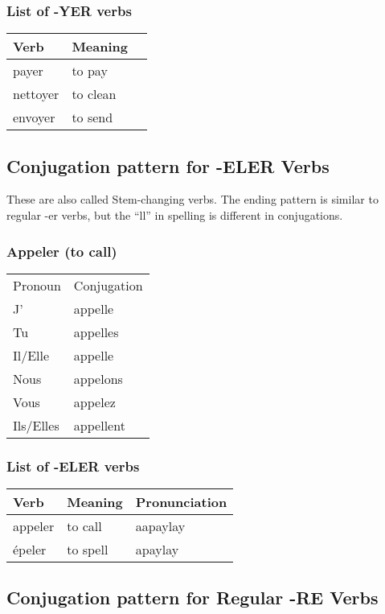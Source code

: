 \subsubsection{List of -YER verbs}
\begin{longtable}{| l | l | l |}
\hline
Verb 		& Meaning 	\\
\hline
\endhead
payer 	& to pay	\\  \hline
nettoyer	& to clean		\\  \hline
envoyer 	& to send	\\  \hline
\end{longtable}


\subsection{Conjugation pattern for -ELER Verbs}
These are also called Stem-changing verbs. The ending pattern is similar
to regular -er verbs, but the ``ll'' in spelling is different in conjugations.

\subsubsection{Appeler (to call)}
\begin{tabular}{| l | l |}
\hline
Pronoun 	& 	Conjugation	\\
J'		&	appelle		\\
Tu		&	appelles	\\
Il/Elle		&	appelle		\\
Nous		&	appelons	\\
Vous		&	appelez		\\
Ils/Elles	&	appellent	\\
\hline
\end{tabular}

\subsubsection{List of -ELER verbs}
\begin{longtable}{| l | l | l |}
\hline
Verb 		& Meaning 		& Pronunciation	\\
\hline
\endhead
appeler 	& to call		& aapaylay	\\
\'epeler 	& to spell		& apaylay	\\
\hline
\end{longtable}

\subsection{Conjugation pattern for Regular -RE Verbs}

